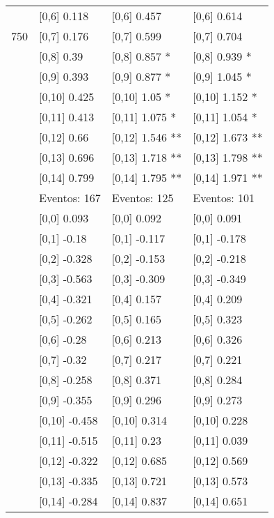 \begin{table}
\begin{tabular}[t]{llll}
 & {}[0,6] 0.118 & {}[0,6] 0.457 & {}[0,6] 0.614\\
750 & {}[0,7] 0.176 & {}[0,7] 0.599 & {}[0,7] 0.704\\
\addlinespace
 & {}[0,8] 0.39 & {}[0,8] 0.857 * & {}[0,8] 0.939 *\\
 & {}[0,9] 0.393 & {}[0,9] 0.877 * & {}[0,9] 1.045 *\\
 & {}[0,10] 0.425 & {}[0,10] 1.05 * & {}[0,10] 1.152 *\\
 & {}[0,11] 0.413 & {}[0,11] 1.075 * & {}[0,11] 1.054 *\\
 & {}[0,12] 0.66 & {}[0,12] 1.546 ** & {}[0,12] 1.673 **\\
\addlinespace
 & {}[0,13] 0.696 & {}[0,13] 1.718 ** & {}[0,13] 1.798 **\\
 & {}[0,14] 0.799 & {}[0,14] 1.795 ** & {}[0,14] 1.971 **\\
 & Eventos:  167 & Eventos:  125 & Eventos:  101\\
 & {}[0,0] 0.093 & {}[0,0] 0.092 & {}[0,0] 0.091\\
 & {}[0,1] -0.18 & {}[0,1] -0.117 & {}[0,1] -0.178\\
\addlinespace
 & {}[0,2] -0.328 & {}[0,2] -0.153 & {}[0,2] -0.218\\
 & {}[0,3] -0.563 & {}[0,3] -0.309 & {}[0,3] -0.349\\
 & {}[0,4] -0.321 & {}[0,4] 0.157 & {}[0,4] 0.209\\
 & {}[0,5] -0.262 & {}[0,5] 0.165 & {}[0,5] 0.323\\
 & {}[0,6] -0.28 & {}[0,6] 0.213 & {}[0,6] 0.326\\
\addlinespace
1000 & {}[0,7] -0.32 & {}[0,7] 0.217 & {}[0,7] 0.221\\
 & {}[0,8] -0.258 & {}[0,8] 0.371 & {}[0,8] 0.284\\
 & {}[0,9] -0.355 & {}[0,9] 0.296 & {}[0,9] 0.273\\
 & {}[0,10] -0.458 & {}[0,10] 0.314 & {}[0,10] 0.228\\
 & {}[0,11] -0.515 & {}[0,11] 0.23 & {}[0,11] 0.039\\
\addlinespace
 & {}[0,12] -0.322 & {}[0,12] 0.685 & {}[0,12] 0.569\\
 & {}[0,13] -0.335 & {}[0,13] 0.721 & {}[0,13] 0.573\\
 & {}[0,14] -0.284 & {}[0,14] 0.837 & {}[0,14] 0.651\\
\bottomrule
\end{tabular}
\end{table}
